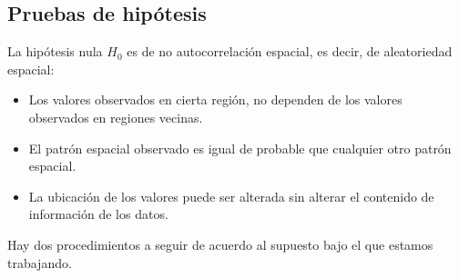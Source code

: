 \subsection{Pruebas de hipótesis}
La hipótesis nula $H_0$ es de no autocorrelación espacial, es decir, de aleatoriedad espacial:
\begin{itemize}
\item Los valores observados en cierta región, no dependen de los valores observados en regiones vecinas.
\item El patrón espacial observado es igual de probable que cualquier otro patrón espacial.
\item La ubicación de los valores puede ser alterada sin alterar el contenido de información de los datos.
\end{itemize}


Hay dos procedimientos a seguir de acuerdo al supuesto bajo el que estamos trabajando.


